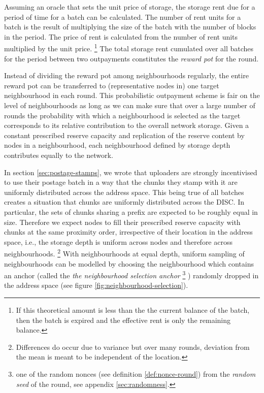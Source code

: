 Assuming an oracle that sets the unit price of storage, the storage rent due for a period of time for a batch can be calculated. The number of rent units for a batch is the result of multiplying the size of the batch with the number of blocks in the period. The price of rent is calculated from the number of rent units multiplied by the unit price.%
%
\footnote{If this theoretical amount is less than the the current balance of the batch, then the batch is expired and the effective rent is only the remaining balance.}
%
The total storage rent cumulated over all batches for the period between two outpayments constitutes the \emph{reward pot} for the round.

Instead of dividing the reward pot among neighbourhoods regularly, the entire reward pot can be transferred to (representative nodes in) one target neighbourhood in each round. This probabilistic outpayment scheme is fair on the level of neighbourhoods as long as we can make sure that over a large number of rounds the probability with which a  
neighbourhood is selected as the target corresponds to its relative contribution to the overall network storage. Given a constant prescribed reserve capacity and replication of the reserve content by nodes in a neighbourhood, each neighbourhood defined by storage depth contributes equally to the network. 

In section \ref{sec:postage-stamps}, we wrote that uploaders are strongly incentivised to use their postage batch in a way that the chunks they stamp with it are uniformly distributed across the address space. This being true of all batches creates a situation that chunks are uniformly distributed across the DISC. In particular, the sets of chunks sharing a prefix are expected to be roughly equal in size. Therefore we expect nodes to fill their prescribed reserve capacity with chunks at the same proximity order, irrespective of their location in the address space, i.e., the storage depth is uniform across  nodes and therefore across neighbourhoods.%
%
\footnote{Differences do occur due to variance but over many rounds, deviation from the mean is meant to be independent of the location.}
%
With neighbourhoods at equal depth, uniform sampling of neighbourhoods can be modelled by choosing the neighbourhood which contains an anchor (called the \emph{the neighbourhood selection anchor}%
%
\footnote{one of the random nonces (see definition \ref{def:nonce-round}) from the \emph{random seed} of the round, see appendix \ref{sec:randomness}.}
%
) randomly dropped in the address space (see figure \ref{fig:neighbourhood-selection}).


